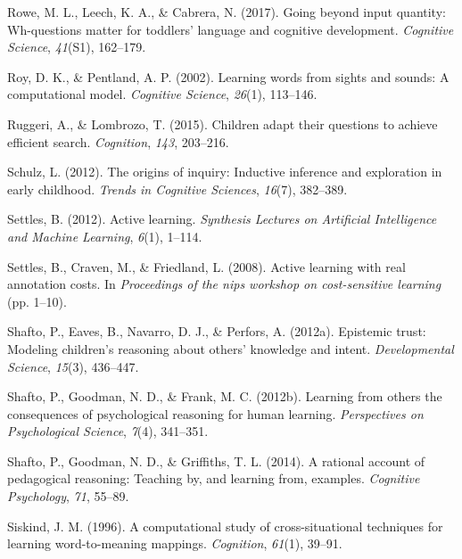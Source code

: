 \documentclass[oneside]{report}
\begin{document}
\leavevmode\hypertarget{ref-rowe2017going}{}%
Rowe, M. L., Leech, K. A., \& Cabrera, N. (2017). Going beyond input
quantity: Wh-questions matter for toddlers' language and cognitive
development. \emph{Cognitive Science}, \emph{41}(S1), 162--179.

\leavevmode\hypertarget{ref-roy2002learning}{}%
Roy, D. K., \& Pentland, A. P. (2002). Learning words from sights and
sounds: A computational model. \emph{Cognitive Science}, \emph{26}(1),
113--146.

\leavevmode\hypertarget{ref-ruggeri2015children}{}%
Ruggeri, A., \& Lombrozo, T. (2015). Children adapt their questions to
achieve efficient search. \emph{Cognition}, \emph{143}, 203--216.

\leavevmode\hypertarget{ref-schulz2012origins}{}%
Schulz, L. (2012). The origins of inquiry: Inductive inference and
exploration in early childhood. \emph{Trends in Cognitive Sciences},
\emph{16}(7), 382--389.

\leavevmode\hypertarget{ref-settles2012active}{}%
Settles, B. (2012). Active learning. \emph{Synthesis Lectures on
Artificial Intelligence and Machine Learning}, \emph{6}(1), 1--114.

\leavevmode\hypertarget{ref-settles2008active}{}%
Settles, B., Craven, M., \& Friedland, L. (2008). Active learning with
real annotation costs. In \emph{Proceedings of the nips workshop on
cost-sensitive learning} (pp. 1--10).

\leavevmode\hypertarget{ref-shafto2012epistemic}{}%
Shafto, P., Eaves, B., Navarro, D. J., \& Perfors, A. (2012a). Epistemic
trust: Modeling children's reasoning about others' knowledge and intent.
\emph{Developmental Science}, \emph{15}(3), 436--447.

\leavevmode\hypertarget{ref-shafto2012learning}{}%
Shafto, P., Goodman, N. D., \& Frank, M. C. (2012b). Learning from
others the consequences of psychological reasoning for human learning.
\emph{Perspectives on Psychological Science}, \emph{7}(4), 341--351.

\leavevmode\hypertarget{ref-shafto2014rational}{}%
Shafto, P., Goodman, N. D., \& Griffiths, T. L. (2014). A rational
account of pedagogical reasoning: Teaching by, and learning from,
examples. \emph{Cognitive Psychology}, \emph{71}, 55--89.

\leavevmode\hypertarget{ref-siskind1996computational}{}%
Siskind, J. M. (1996). A computational study of cross-situational
techniques for learning word-to-meaning mappings. \emph{Cognition},
\emph{61}(1), 39--91.
\end{document}
